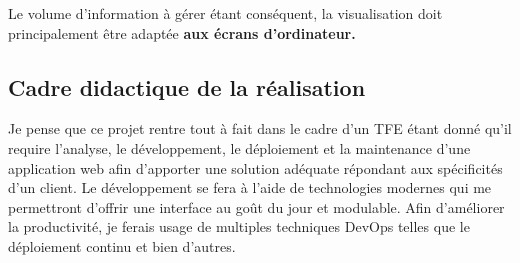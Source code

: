 Le volume d'information à gérer étant conséquent, la visualisation doit principalement être adaptée \textbf{aux écrans d'ordinateur.}

\subsection{Cadre didactique de la réalisation}

Je pense que ce projet rentre tout à fait dans le cadre d'un TFE étant donné qu'il require l'analyse, le développement, le déploiement et la maintenance d'une application web afin d'apporter une solution adéquate répondant aux spécificités d'un client.
Le développement se fera à l'aide de technologies modernes qui me permettront d'offrir une interface au goût du jour et modulable. Afin d'améliorer la productivité, je ferais usage de multiples techniques DevOps telles que le déploiement continu et bien d'autres.


